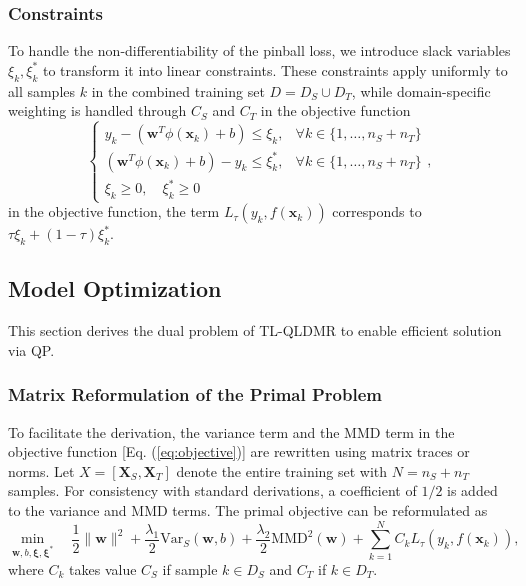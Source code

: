 \documentclass[a4paper]{cas-sc}
\begin{document}
\subsubsection{Constraints}
To handle the non-differentiability of the pinball loss, we introduce slack variables $\xi_k, \xi_k^*$ to transform it into linear constraints. These constraints apply uniformly to all samples $k$ in the combined training set $D = D_S \cup D_T$, while domain-specific weighting is handled through $C_S$ and $C_T$ in the objective function
\begin{equation}
\label{eq:constraints}
\begin{cases}
y_k - (\boldsymbol{w}^T\phi(\boldsymbol{x}_k) + b) \le \xi_k, & \forall k \in \{1, \dots, n_S + n_T\} \\
(\boldsymbol{w}^T\phi(\boldsymbol{x}_k) + b) - y_k \le \xi_k^*, & \forall k \in \{1, \dots, n_S + n_T\} \\
\xi_k \ge 0, \quad \xi_k^* \ge 0
\end{cases},
\end{equation}
in the objective function, the term $L_{\tau}(y_k, f(\boldsymbol{x}_k))$ corresponds to $\tau \xi_k + (1-\tau) \xi_k^*$.

\subsection{Model Optimization}\label{optimization}
This section derives the dual problem of TL-QLDMR to enable efficient solution via QP.

\subsubsection{Matrix Reformulation of the Primal Problem}
To facilitate the derivation, the variance term and the MMD term in the objective function [Eq. (\ref{eq:objective})] are rewritten using matrix traces or norms. Let $X = [\boldsymbol{X}_S, \boldsymbol{X}_T]$ denote the entire training set with $N = n_S + n_T$ samples.
For consistency with standard derivations, a coefficient of $1/2$ is added to the variance and MMD terms. The primal objective can be reformulated as
\begin{equation}
\label{eq:primal_matrix}
\min_{\boldsymbol{w}, b, \boldsymbol{\xi}, \boldsymbol{\xi}^*} \quad \frac{1}{2} \|\boldsymbol{w}\|^2 + \frac{\lambda_1}{2} \text{Var}_S(\boldsymbol{w}, b) + \frac{\lambda_2}{2} \text{MMD}^2(\boldsymbol{w}) + \sum_{k=1}^N C_k L_\tau(y_k, f(\boldsymbol{x}_k)),
\end{equation}
where $C_k$ takes value $C_S$ if sample $k \in D_S$ and $C_T$ if $k \in D_T$.
\end{document}

